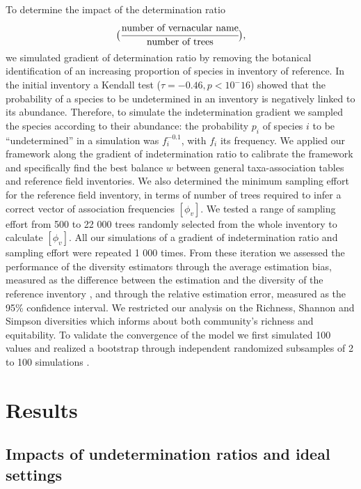 \documentclass[fleqn,10pt]{ArtEcoFoG} %
\begin{document}
To determine the impact of the determination ratio
\[\big(\cfrac{\text{number of vernacular name}}{\text{number of trees}}\big),\]
we simulated gradient of determination ratio by removing the botanical
identification of an increasing proportion of species in inventory of
reference. In the initial inventory a Kendall test
(\(\tau = -0.46, p < 10^-16\)) showed that the probability of a species
to be undetermined in an inventory is negatively linked to its
abundance. Therefore, to simulate the indetermination gradient we
sampled the species according to their abundance: the probability
\(p_i\) of species \(i\) to be ``undetermined'' in a simulation was
\(f_i^{-0.1}\), with \(f_i\) its frequency. We applied our framework
along the gradient of indetermination ratio to calibrate the framework
and specifically find the best balance \(w\) between general
taxa-association tables and reference field inventories. We also
determined the minimum sampling effort for the reference field
inventory, in terms of number of trees required to infer a correct
vector of association frequencies \([\phi_v]\). We tested a range of
sampling effort from 500 to 22 000 trees randomly selected from the
whole inventory to calculate \([\phi_v]\). All our simulations of a
gradient of indetermination ratio and sampling effort were repeated 1
000 times. From these iteration we assessed the performance of the
diversity estimators through the average estimation bias, measured as
the difference between the estimation and the diversity of the reference
inventory \citep{Baltanas2009}, and through the relative estimation
error, measured as the 95\% confidence interval. We restricted our
analysis on the Richness, Shannon and Simpson diversities which informs
about both community's richness and equitability. To validate the
convergence of the model we first simulated 100 values and realized a
bootstrap through independent randomized subsamples of 2 to 100
simulations .

\section{Results}\label{results}

\subsection{Impacts of undetermination ratios and ideal
settings}\label{impacts-of-undetermination-ratios-and-ideal-settings}
\end{document}
